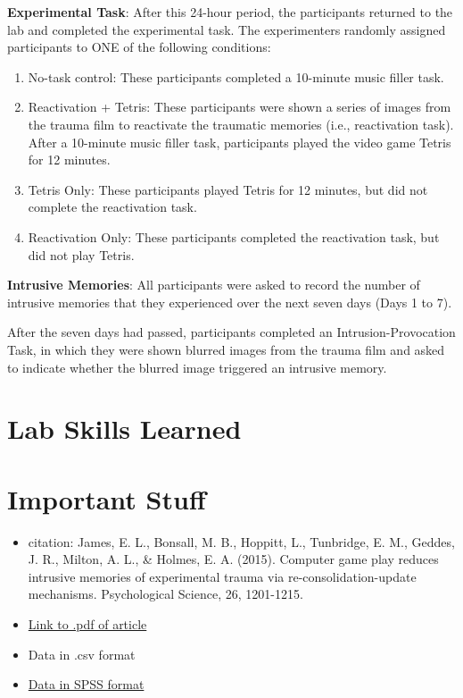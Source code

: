 \documentclass[
]{book}
\providecommand{\tightlist}{%
  \setlength{\itemsep}{0pt}\setlength{\parskip}{0pt}}
\begin{document}
\textbf{Experimental Task}: After this 24-hour period, the participants returned to the lab and completed the experimental task. The experimenters randomly assigned participants to ONE of the following conditions:

\begin{enumerate}
\def\labelenumi{\arabic{enumi}.}
\tightlist
\item
  No-task control: These participants completed a 10-minute music filler task.
\item
  Reactivation + Tetris: These participants were shown a series of images from the trauma film to reactivate the traumatic memories (i.e., reactivation task). After a 10-minute music filler task, participants played the video game Tetris for 12 minutes.
\item
  Tetris Only: These participants played Tetris for 12 minutes, but did not complete the reactivation task.
\item
  Reactivation Only: These participants completed the reactivation task, but did not play Tetris.
\end{enumerate}

\textbf{Intrusive Memories}: All participants were asked to record the number of intrusive memories that they experienced over the next seven days (Days 1 to 7).

After the seven days had passed, participants completed an Intrusion-Provocation Task, in which they were shown blurred images from the trauma film and asked to indicate whether the blurred image triggered an intrusive memory.

\hypertarget{lab-skills-learned-2}{%
\section{Lab Skills Learned}\label{lab-skills-learned-2}}

\hypertarget{important-stuff-2}{%
\section{Important Stuff}\label{important-stuff-2}}

\begin{itemize}
\tightlist
\item
  citation: James, E. L., Bonsall, M. B., Hoppitt, L., Tunbridge, E. M., Geddes, J. R., Milton, A. L., \& Holmes, E. A. (2015). Computer game play reduces intrusive memories of experimental trauma via re-consolidation-update mechanisms. Psychological Science, 26, 1201-1215.
\item
  \href{http://journals.sagepub.com/stoken/default+domain/hQ2W4fbPrZVJ7eyNJaqu/full}{Link to .pdf of article}
\item
  Data in .csv format
\item
  \href{https://drive.google.com/file/d/0Bz-rhZ21ShvOZ1lvQ0dQekZGWU0/view?usp=sharing}{Data in SPSS format}
\end{itemize}
\end{document}
